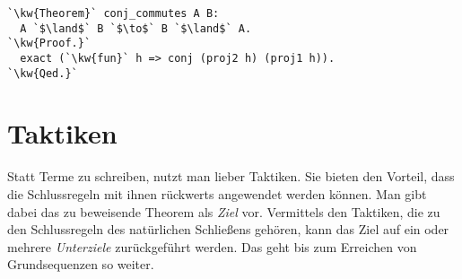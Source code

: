 \noindent
\begin{lstlisting}[escapechar=`]
`\kw{Theorem}` conj_commutes A B:
  A `$\land$` B `$\to$` B `$\land$` A.
`\kw{Proof.}`
  exact (`\kw{fun}` h => conj (proj2 h) (proj1 h)).
`\kw{Qed.}`
\end{lstlisting}

\section{Taktiken}

Statt Terme zu schreiben, nutzt man lieber Taktiken. Sie bieten den
Vorteil, dass die Schlussregeln mit ihnen rückwerts angewendet werden
können. Man gibt dabei das zu beweisende Theorem als \emph{Ziel}
vor. Vermittels den Taktiken, die zu den Schlussregeln des natürlichen
Schließens gehören, kann das Ziel auf ein oder mehrere
\emph{Unterziele} zurückgeführt werden. Das geht bis zum Erreichen
von Grundsequenzen so weiter.
